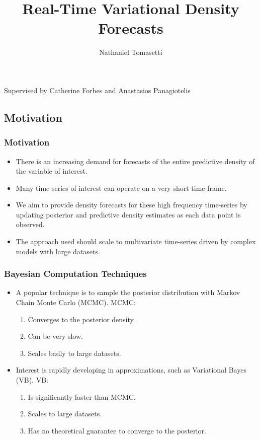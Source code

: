 \documentclass{beamer}\usepackage[]{graphicx}\usepackage[]{color}
\title[Real-Time Variational Density Forecasts]{Real-Time Variational Density Forecasts}
\author[Nathaniel Tomasetti]{Nathaniel Tomasetti}
\date{ }
\begin{document}
\begin{frame}
\titlepage
\centering
Supervised by Catherine Forbes and Anastasios Panagiotelis
\end{frame}


\begin{frame}
\tableofcontents
\end{frame}


\begin{frame}
\section{Motivation}
\frametitle{Motivation}
\begin{itemize}
\item There is an increasing demand for forecasts of the entire predictive density of the variable of interest.
\item Many time series of interest can operate on a very short time-frame.
\item We aim to provide density forecasts for these high frequency time-series by updating posterior and predictive density estimates as each data point is observed.
\item The approach used should scale to multivariate time-series driven by complex models with large datasets.
\end{itemize}
\end{frame}


\begin{frame}
\frametitle{Bayesian Computation Techniques}
\begin{itemize}
\item A popular technique is to sample the posterior distribution with Markov Chain Monte Carlo (MCMC). MCMC:
\begin{enumerate}
\item Converges to the posterior density.
\item Can be very slow.
\item Scales badly to large datasets.
\end{enumerate}
\item Interest is rapidly developing in approximations, such as Variational Bayes (VB). VB:
\begin{enumerate}
\item Is significantly faster than MCMC.
\item Scales to large datasets.
\item Has no theoretical guarantee to converge to the posterior.
\end{enumerate}
\end{itemize}
\end{frame}
\end{document}
